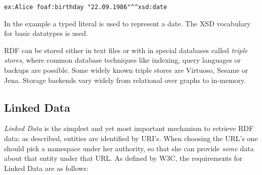 \begin{lstlisting}[style=N3]
ex:Alice foaf:birthday "22.09.1986"^^xsd:date
\end{lstlisting}
In the example a typed literal is used to represent a date. 
The XSD vocabulary for basic datatypes is used.

RDF can be stored either in text files or with in special databases called \textit{triple stores}, where common database techniques like indexing, query languages or backups are possible. 
Some widely known triple stores are Virtuoso, Sesame  or Jena. 
Storage backends vary widely from relational over graphs to in-memory.

\subsection{Linked Data}
\textit{Linked Data} is the simplest and yet most important mechanism to retrieve RDF data: as described, entities are identified by URI's. 
When choosing the URL's one should pick a namespace under her authority, so that she can provide \textit{some} data about that entity under that URL. As defined by W3C, the requirements for Linked Data are as follows:

